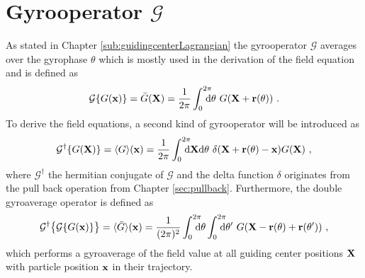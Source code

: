 \section{Gyrooperator $\mathcal{G}$}
\label{sec:gyroOperator}

As stated in Chapter \ref{sub:guidingcenterLagrangian} the gyrooperator $\mathcal{G}$ averages over the gyrophase $\theta$ which is mostly used in the derivation of the field equation and is defined as
\begin{gather}
    \mathcal{G} \{G(\boldsymbol{\mathbf{x}})\} = \bar{G}(\boldsymbol{\mathbf{X}}) = \frac{1}{2\pi} \int_{0}^{2\pi} \!\!\!\!\! \mathrm{d}\theta ~ G(\boldsymbol{\mathbf{X}} + \boldsymbol{\mathbf{r}}(\theta))~.
    \label{eq:gyroOperatorRevision}
\end{gather}
To derive the field equations, a second kind of gyrooperator will be introduced as
\begin{gather}
    \mathcal{G}^\dagger \{G(\boldsymbol{\mathbf{X}})\} = \langle G\rangle(\boldsymbol{\mathbf{x}}) = \frac{1}{2\pi} \int_{0}^{2\pi} \!\!\!\!\! \mathrm{d}\boldsymbol{\mathbf{X}}\mathrm{d}\theta ~ \delta(\boldsymbol{\mathbf{X}} + \boldsymbol{\mathbf{r}}(\theta) - \boldsymbol{\mathbf{x}}) G(\boldsymbol{\mathbf{X}})~,
    \label{eq:gyroOperatorDagger}
\end{gather}
where $\mathcal{G}^\dagger$ the hermitian conjugate of $\mathcal{G}$\cite{Told_PHD} and the delta function $\delta$ originates from the pull back operation from Chapter \ref{sec:pullback}.\cite{Merlo_PHD} Furthermore, the double gyroaverage operator is defined as
\begin{gather}
    \tgad{\bigl\{ \tga{\{G(\x)\}} \bigr\}} = \gad{\ga{G}}(\x) = \frac{1}{(2\pi)^2} \intss{0}{2\pi} \dtheta \intss{0}{2\pi} \dtheta' ~ G(\X - \rrho(\theta) + \rrho(\theta'))~,
    \label{eq:gyroOperatorDouble}
\end{gather}
which performs a gyroaverage of the field value at all guiding center positions $\boldsymbol{\mathbf{X}}$ with particle position $\boldsymbol{\mathbf{x}}$ in their trajectory. \cite{Maurer_PHD}

